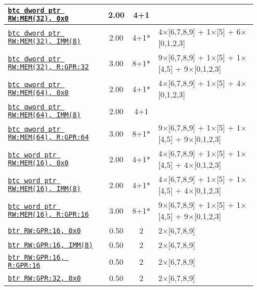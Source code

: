 \documentclass[a4paper,english,fontsize=9]{scrartcl}
\begin{document}
\begin{longtable}{p{}ccL{.25\textwidth}}
  \midrule
  \texttt{\href{https://felixcloutier.com/x86/BTC.html}{btc dword ptr RW:MEM(32), 0x0}} & 2.00 & 4+1 &  \\
  \midrule
  \texttt{\href{https://felixcloutier.com/x86/BTC.html}{btc dword ptr RW:MEM(32), IMM(8)}} & 2.00 & 4+1* & 4\(\times\)[6,7,8,9] + 1\(\times\)[5] + 6\(\times\)[0,1,2,3] \\
  \midrule
  \texttt{\href{https://felixcloutier.com/x86/BTC.html}{btc dword ptr RW:MEM(32), R:GPR:32}} & 3.00 & 8+1* & 9\(\times\)[6,7,8,9] + 1\(\times\)[5] + 1\(\times\)[4,5] + 9\(\times\)[0,1,2,3] \\
  \midrule
  \texttt{\href{https://felixcloutier.com/x86/BTC.html}{btc qword ptr RW:MEM(64), 0x0}} & 2.00 & 4+1* & 4\(\times\)[6,7,8,9] + 1\(\times\)[5] + 4\(\times\)[0,1,2,3] \\
  \midrule
  \texttt{\href{https://felixcloutier.com/x86/BTC.html}{btc qword ptr RW:MEM(64), IMM(8)}} & 2.00 & 4+1 &  \\
  \midrule
  \texttt{\href{https://felixcloutier.com/x86/BTC.html}{btc qword ptr RW:MEM(64), R:GPR:64}} & 3.00 & 8+1* & 9\(\times\)[6,7,8,9] + 1\(\times\)[5] + 1\(\times\)[4,5] + 9\(\times\)[0,1,2,3] \\
  \midrule
  \texttt{\href{https://felixcloutier.com/x86/BTC.html}{btc word ptr RW:MEM(16), 0x0}} & 2.00 & 4+1* & 4\(\times\)[6,7,8,9] + 1\(\times\)[5] + 1\(\times\)[4,5] + 4\(\times\)[0,1,2,3] \\
  \midrule
  \texttt{\href{https://felixcloutier.com/x86/BTC.html}{btc word ptr RW:MEM(16), IMM(8)}} & 2.00 & 4+1* & 4\(\times\)[6,7,8,9] + 1\(\times\)[5] + 1\(\times\)[4,5] + 4\(\times\)[0,1,2,3] \\
  \midrule
  \texttt{\href{https://felixcloutier.com/x86/BTC.html}{btc word ptr RW:MEM(16), R:GPR:16}} & 3.00 & 8+1* & 9\(\times\)[6,7,8,9] + 1\(\times\)[5] + 1\(\times\)[4,5] + 9\(\times\)[0,1,2,3] \\
  \midrule
  \texttt{\href{https://felixcloutier.com/x86/BTR.html}{btr RW:GPR:16, 0x0}} & 0.50 & 2 & 2\(\times\)[6,7,8,9] \\
  \midrule
  \texttt{\href{https://felixcloutier.com/x86/BTR.html}{btr RW:GPR:16, IMM(8)}} & 0.50 & 2 & 2\(\times\)[6,7,8,9] \\
  \midrule
  \texttt{\href{https://felixcloutier.com/x86/BTR.html}{btr RW:GPR:16, R:GPR:16}} & 0.50 & 2 & 2\(\times\)[6,7,8,9] \\
  \midrule
  \texttt{\href{https://felixcloutier.com/x86/BTR.html}{btr RW:GPR:32, 0x0}} & 0.50 & 2 & 2\(\times\)[6,7,8,9] \\

\end{longtable}
\end{document}
